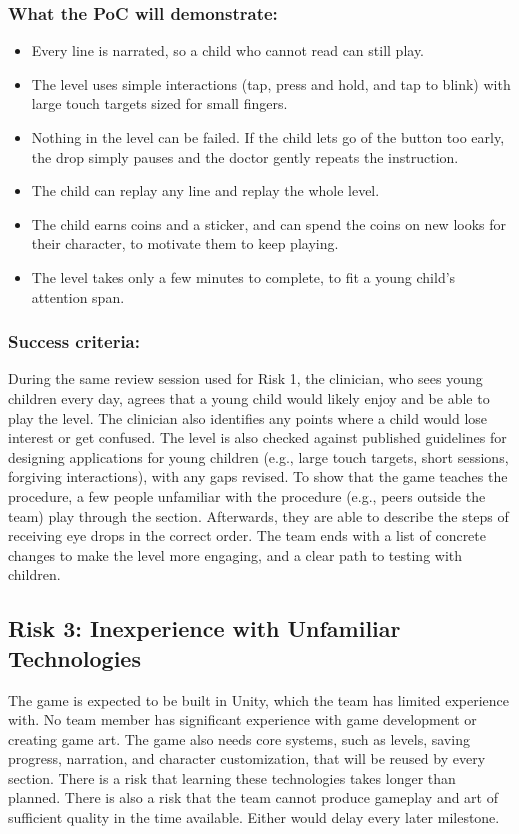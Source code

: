 \documentclass{article}
\begin{document}
\subsubsection*{What the PoC will demonstrate:}
\begin{itemize}
  \item Every line is narrated, so a child who cannot read can still play.
  \item The level uses simple interactions (tap, press and hold, and tap to
  blink) with large touch targets sized for small fingers.
  \item Nothing in the level can be failed. If the child lets go of the button
  too early, the drop simply pauses and the doctor gently repeats the
  instruction.
  \item The child can replay any line and replay the whole level.
  \item The child earns coins and a sticker, and can spend the coins on new
  looks for their character, to motivate them to keep playing.
  \item The level takes only a few minutes to complete, to fit a young child's
  attention span.
\end{itemize}

\subsubsection*{Success criteria:}
During the same review session used for Risk 1, the clinician, who sees young
children every day, agrees that a young child would likely enjoy and be able to
play the level. The clinician also identifies any points where a child would
lose interest or get confused. The level is also checked against published
guidelines for designing applications for young children (e.g., large touch
targets, short sessions, forgiving interactions), with any gaps revised. To show
that the game teaches the procedure, a few people unfamiliar with the procedure
(e.g., peers outside the team) play through the section. Afterwards, they are
able to describe the steps of receiving eye drops in the correct order. The team
ends with a list of concrete changes to make the level more engaging, and a
clear path to testing with children.

\subsection{Risk 3: Inexperience with Unfamiliar Technologies}

The game is expected to be built in Unity, which the team has limited
experience with. No team member has significant experience with game
development or creating game art. The game also needs core systems, such as
levels, saving progress, narration, and character customization, that will be
reused by every section. There is a risk that learning these technologies takes
longer than planned. There is also a risk that the team cannot produce gameplay
and art of sufficient quality in the time available. Either would delay every
later milestone.
\end{document}
